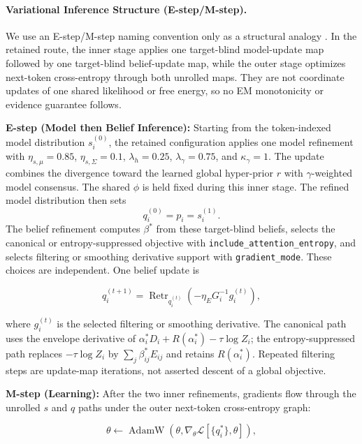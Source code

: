 \documentclass[twoside,11pt]{article}
\begin{document}
\paragraph{Variational Inference Structure (E-step/M-step).}
We use an E-step/M-step naming convention only as a structural analogy \citep{Dempster1977,Neal1998}. In the retained route, the inner stage applies one target-blind model-update map followed by one target-blind belief-update map, while the outer stage optimizes next-token cross-entropy through both unrolled maps. They are not coordinate updates of one shared likelihood or free energy, so no EM monotonicity or evidence guarantee follows.

\textbf{E-step (Model then Belief Inference):} Starting from the token-indexed model distribution $s_i^{(0)}$, the retained configuration applies one model refinement with $\eta_{s,\mu}=0.85$, $\eta_{s,\Sigma}=0.1$, $\lambda_h=0.25$, $\lambda_\gamma=0.75$, and $\kappa_\gamma=1$. The update combines the divergence toward the learned global hyper-prior $r$ with $\gamma$-weighted model consensus. The shared $\phi$ is held fixed during this inner stage. The refined model distribution then sets
\begin{equation}
q_i^{(0)}=p_i=s_i^{(1)}.
\label{eq:model_channel_seed}
\end{equation}
The belief refinement computes $\beta^*$ from these target-blind beliefs, selects the canonical or entropy-suppressed objective with \texttt{include\_attention\_entropy}, and selects filtering or smoothing derivative support with \texttt{gradient\_mode}. These choices are independent. One belief update is

\begin{equation}
q_i^{(t+1)}
=\operatorname{Retr}_{q_i^{(t)}}
\left(-\eta_EG_i^{-1}g_i^{(t)}\right),
\end{equation}

where $g_i^{(t)}$ is the selected filtering or smoothing derivative. The canonical path uses the envelope derivative of $\alpha_i^*D_i+R(\alpha_i^*)-\tau\log Z_i$; the entropy-suppressed path replaces $-\tau\log Z_i$ by $\sum_j\beta_{ij}^*E_{ij}$ and retains $R(\alpha_i^*)$. Repeated filtering steps are update-map iterations, not asserted descent of a global objective.

\textbf{M-step (Learning):} After the two inner refinements, gradients flow through the unrolled $s$ and $q$ paths under the outer next-token cross-entropy graph:

\begin{equation}
\theta \leftarrow \operatorname{AdamW}\left(\theta,\nabla_{\theta}\mathcal{L}[\{q_i^*\},\theta]\right),
\end{equation}
\end{document}
